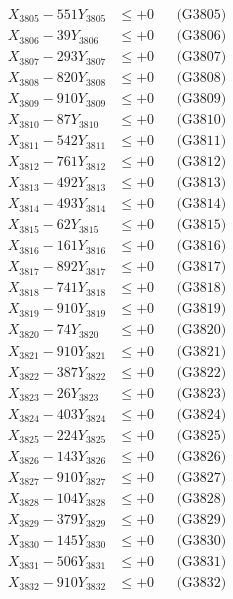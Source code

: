 \documentclass[a4paper,10pt]{article}
\begin{document}
{\begin{align}
X_{3805} - 551Y_{3805} &\leq +0 && \text{(G3805)} \\
X_{3806} - 39Y_{3806} &\leq +0 && \text{(G3806)} \\
X_{3807} - 293Y_{3807} &\leq +0 && \text{(G3807)} \\
X_{3808} - 820Y_{3808} &\leq +0 && \text{(G3808)} \\
X_{3809} - 910Y_{3809} &\leq +0 && \text{(G3809)} \\
X_{3810} - 87Y_{3810} &\leq +0 && \text{(G3810)} \\
\allowbreak
X_{3811} - 542Y_{3811} &\leq +0 && \text{(G3811)} \\
X_{3812} - 761Y_{3812} &\leq +0 && \text{(G3812)} \\
X_{3813} - 492Y_{3813} &\leq +0 && \text{(G3813)} \\
X_{3814} - 493Y_{3814} &\leq +0 && \text{(G3814)} \\
X_{3815} - 62Y_{3815} &\leq +0 && \text{(G3815)} \\
X_{3816} - 161Y_{3816} &\leq +0 && \text{(G3816)} \\
X_{3817} - 892Y_{3817} &\leq +0 && \text{(G3817)} \\
X_{3818} - 741Y_{3818} &\leq +0 && \text{(G3818)} \\
X_{3819} - 910Y_{3819} &\leq +0 && \text{(G3819)} \\
X_{3820} - 74Y_{3820} &\leq +0 && \text{(G3820)} \\
\allowbreak
X_{3821} - 910Y_{3821} &\leq +0 && \text{(G3821)} \\
X_{3822} - 387Y_{3822} &\leq +0 && \text{(G3822)} \\
X_{3823} - 26Y_{3823} &\leq +0 && \text{(G3823)} \\
X_{3824} - 403Y_{3824} &\leq +0 && \text{(G3824)} \\
X_{3825} - 224Y_{3825} &\leq +0 && \text{(G3825)} \\
X_{3826} - 143Y_{3826} &\leq +0 && \text{(G3826)} \\
X_{3827} - 910Y_{3827} &\leq +0 && \text{(G3827)} \\
X_{3828} - 104Y_{3828} &\leq +0 && \text{(G3828)} \\
X_{3829} - 379Y_{3829} &\leq +0 && \text{(G3829)} \\
X_{3830} - 145Y_{3830} &\leq +0 && \text{(G3830)} \\
\allowbreak
X_{3831} - 506Y_{3831} &\leq +0 && \text{(G3831)} \\
X_{3832} - 910Y_{3832} &\leq +0 && \text{(G3832)} \\

\end{align}}
\end{document}
